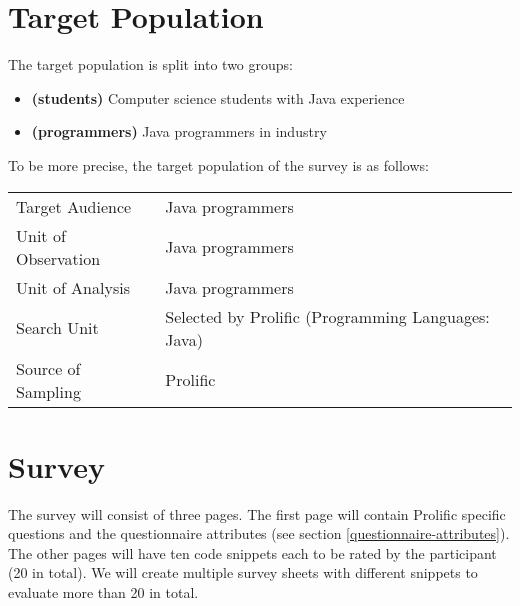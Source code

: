 \documentclass[%
class=scrreprt,
chapterprefix=false,%
open=right,%
twoside=false,%
paper=a4,%
logofile={Logo\_zentral\_farbig\_EN.png},%
thesistype=masterproposal,%
UKenglish,%
]{se2thesis}
\begin{document}
\section{Target Population} \label{target-population}
The target population is split into two groups:
\begin{itemize}
	\item \label{students} \textbf{(students)}
	Computer science students with Java experience
	\item \label{programmers} \textbf{(programmers)} Java programmers in industry
\end{itemize}

To be more precise, the target population of the survey is as follows:
\begin{center}
	\begin{tabular}{|l|l|}
		\hline
		Target Audience      & Java programmers \\
		Unit of Observation  & Java programmers \\
		Unit of Analysis     & Java programmers \\
		Search Unit %
		& Selected by Prolific (Programming Languages: Java)\\
		Source of Sampling   & %
		Prolific \\
		\hline
	\end{tabular}
\end{center}


\section{Survey}
The survey will consist of three pages. The first page will contain Prolific specific questions and the questionnaire attributes (see section \ref{questionnaire-attributes}). The other pages will have ten code snippets each to be rated by the participant (20 in total).
We will create multiple survey sheets with different snippets to evaluate more than 20 in total.
\end{document}
